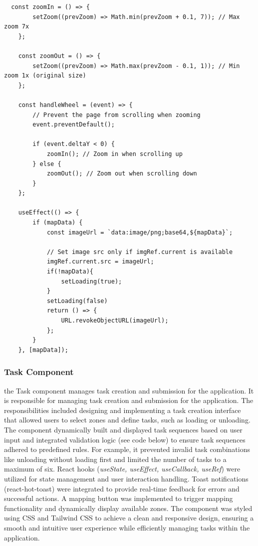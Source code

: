 \documentclass[a4paper,12pt]{extreport}
\begin{document}
  \begin{verbatim}
  const zoomIn = () => {
        setZoom((prevZoom) => Math.min(prevZoom + 0.1, 7)); // Max zoom 7x
    };

    const zoomOut = () => {
        setZoom((prevZoom) => Math.max(prevZoom - 0.1, 1)); // Min zoom 1x (original size)
    };

    const handleWheel = (event) => {
        // Prevent the page from scrolling when zooming
        event.preventDefault();
        
        if (event.deltaY < 0) {
            zoomIn(); // Zoom in when scrolling up
        } else {
            zoomOut(); // Zoom out when scrolling down
        }
    };

    useEffect(() => {
        if (mapData) {
            const imageUrl = `data:image/png;base64,${mapData}`;

            // Set image src only if imgRef.current is available
            imgRef.current.src = imageUrl;
            if(!mapData){
                setLoading(true);
            }
            setLoading(false)
            return () => {
                URL.revokeObjectURL(imageUrl);
            };
        }
    }, [mapData]);

\end{verbatim}



\subsubsection{Task Component}

the Task component manages task creation and submission for the
application. It is responsible for managing task creation and submission
for the application. The responsibilities included designing and
implementing a task creation interface that allowed users to select
zones and define tasks, such as loading or unloading. The component
dynamically built and displayed task sequences based on user input and
integrated validation logic (see code below) to ensure task sequences
adhered to predefined rules. For example, it prevented invalid task
combinations like unloading without loading first and limited the number
of tasks to a maximum of six. React hooks (\emph{useState, useEffect,
useCallback, useRef}) were utilized for state management and user
interaction handling. Toast notifications (react-hot-toast) were
integrated to provide real-time feedback for errors and successful
actions. A mapping button was implemented to trigger mapping
functionality and dynamically display available zones. The component was
styled using CSS and Tailwind CSS to achieve a clean and responsive
design, ensuring a smooth and intuitive user experience while
efficiently managing tasks within the application.
\end{document}

